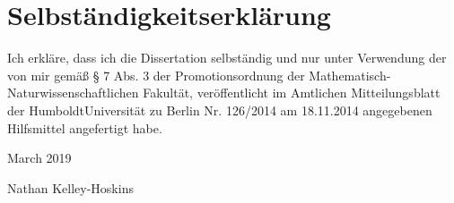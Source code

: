 
\chapter{Selbst{\"a}ndigkeitserkl{\"a}rung}

Ich erkl{\"a}re, dass ich die Dissertation selbständig und nur unter Verwendung der von mir gem{\"a}{\ss} § 7 Abs. 3 der Promotionsordnung der Mathematisch-Naturwissenschaftlichen Fakult{\"a}t, veröffentlicht im Amtlichen Mitteilungsblatt der HumboldtUniversität zu Berlin Nr. 126/2014 am 18.11.2014 angegebenen Hilfsmittel angefertigt habe.



\CaptionBlankLine
\CaptionBlankLine
{} March 2019

\CaptionBlankLine
\CaptionBlankLine
\CaptionBlankLine
Nathan Kelley-Hoskins

